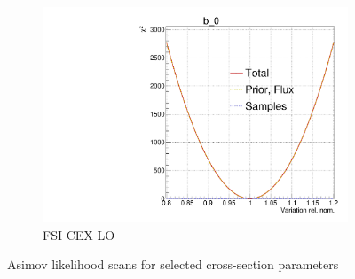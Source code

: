 \begin{figure}[h]
\begin{subfigure}[t]{0.32\textwidth}
		\includegraphics[width=\textwidth, trim={0mm 0mm 0mm 11mm}, clip,page=105]{figures/mach3/Asimov/Full_LLHscan_18July_BeRPA_U_ND280logL_scan}
		\caption{FSI CEX LO}
	\end{subfigure}
	\caption{Asimov likelihood scans for selected cross-section parameters}
	\label{fig:xsec_asimov_llh}
\end{figure}

